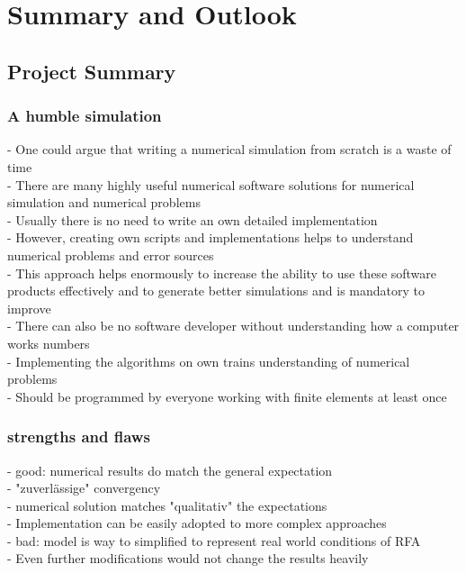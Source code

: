 \documentclass[parskip=half, titlepage=yes, 12pt, BCOR=12mm, DIV=calc]{scrartcl}
\begin{document}

\section{Summary and Outlook}

\subsection{Project Summary}
\subsubsection{A humble simulation}
- One could argue that writing a numerical simulation from scratch is a waste of time \\
- There are many highly useful numerical software solutions for numerical simulation and numerical problems \\
- Usually there is no need to write an own detailed implementation \\
- However, creating own scripts and implementations helps to understand numerical problems and error sources \\
- This approach helps enormously to increase the ability to use these software products effectively and to generate better simulations and is mandatory to improve \\
- There can also be no software developer without understanding how a computer works numbers \\
- Implementing the algorithms on own trains understanding of numerical problems \\
- Should be programmed by everyone working with finite elements at least once \\

\subsubsection{strengths and flaws}
- good: numerical results do match the general expectation \\
- "zuverlässige" convergency \\
- numerical solution matches "qualitativ" the expectations \\
- Implementation can be easily adopted to more complex approaches \\

- bad: model is way to simplified to represent real world conditions of RFA \\
- Even further modifications would not change the results heavily \\
\end{document}
